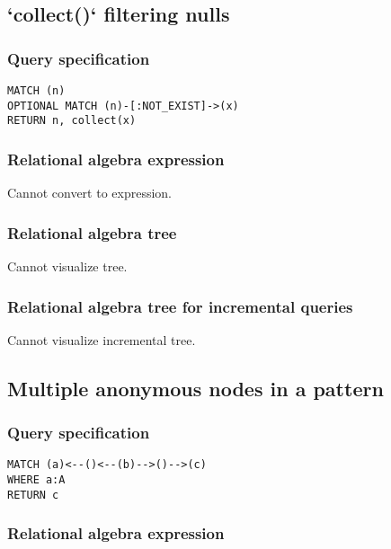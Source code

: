 \subsection{`collect()` filtering nulls}

\subsubsection*{Query specification}

\begin{lstlisting}
MATCH (n)
OPTIONAL MATCH (n)-[:NOT_EXIST]->(x)
RETURN n, collect(x)
\end{lstlisting}

\subsubsection*{Relational algebra expression}

Cannot convert to expression.

\subsubsection*{Relational algebra tree}

Cannot visualize tree.

\subsubsection*{Relational algebra tree for incremental queries}

Cannot visualize incremental tree.

\subsection{Multiple anonymous nodes in a pattern}

\subsubsection*{Query specification}

\begin{lstlisting}
MATCH (a)<--()<--(b)-->()-->(c)
WHERE a:A
RETURN c
\end{lstlisting}

\subsubsection*{Relational algebra expression}

